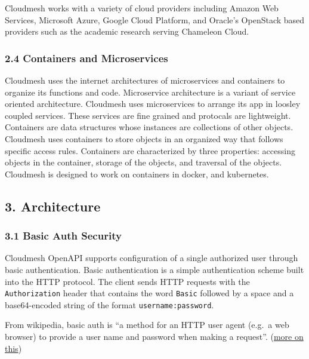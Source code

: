 Cloudmesh works with a variety of cloud providers including Amazon Web
Services, Microsoft Azure, Google Cloud Platform, and Oracle's OpenStack
based providers such as the academic research serving Chameleon Cloud.

\hypertarget{containers-and-microservices}{%
\subsubsection{2.4 Containers and
Microservices}\label{containers-and-microservices}}

Cloudmesh uses the internet architectures of microservices and
containers to organize its functions and code. Microservice architecture
is a variant of service oriented architecture. Cloudmesh uses
microservices to arrange its app in loosley coupled services. These
services are fine grained and protocals are lightweight. Containers are
data structures whose instances are collections of other objects.
Cloudmesh uses containers to store objects in an organized way that
follows specific access rules. Containers are characterized by three
properties: accessing objects in the container, storage of the objects,
and traversal of the objects. Cloudmesh is designed to work on
containers in docker, and kubernetes.

\hypertarget{architecture}{%
\subsection{3. Architecture}\label{architecture}}

\hypertarget{basic-auth-security}{%
\subsubsection{3.1 Basic Auth Security}\label{basic-auth-security}}

Cloudmesh OpenAPI supports configuration of a single authorized user
through basic authentication. Basic authentication is a simple
authentication scheme built into the HTTP protocol. The client sends
HTTP requests with the \texttt{Authorization} header that contains the
word \texttt{Basic} followed by a space and a base64-encoded string of
the format \texttt{username:password}.

From wikipedia, basic auth is ``a method for an HTTP user agent (e.g.~a
web browser) to provide a user name and password when making a
request''. (\href{https://github.com/cloudmesh/cloudmesh-openapi}{more
on this})

